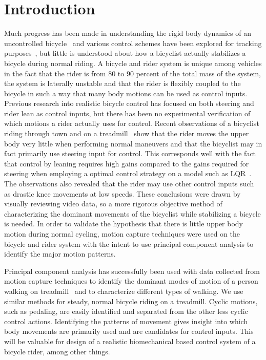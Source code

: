 \section{Introduction}
\label{intro}
Much progress has been made in understanding the rigid body dynamics of an uncontrolled bicycle~\cite{Meijaard2007} and various control schemes have been explored for tracking purposes~\cite{Peterson2008a,Schwab2008,Sharp2008a}, but little is understood about how a bicyclist actually stabilizes a bicycle during normal riding. A bicycle and rider system is unique among vehicles in the fact that the rider is from 80 to 90 percent of the total mass of the system, the system is laterally unstable and that the rider is flexibly coupled to the bicycle in such a way that many body motions can be used as control inputs. Previous research into realistic bicycle control has focused on both steering and rider lean as control inputs, but there has been no experimental verification of which motions a rider actually uses for control. Recent observations of a bicyclist riding through town and on a treadmill~\cite{Kooijman2009a} show that the rider moves the upper body very little when performing normal maneuvers and that the bicyclist may in fact primarily use steering input for control. This corresponds well with the fact that control by leaning requires high gains compared to the gains required for steering when employing a optimal control strategy on a model such as LQR~\cite{Peterson2008a,Schwab2008,Sharp2008a}. The observations also revealed that the rider may use other control inputs such as drastic knee movements at low speeds. These conclusions were drawn by visually reviewing video data, so a more rigorous objective method of characterizing the dominant movements of the bicyclist while stabilizing a bicycle is needed. In order to validate the hypothesis that there is little upper body motion during normal cycling, motion capture techniques were used on the bicycle and rider system with the intent to use principal component analysis to identify the major motion patterns.

Principal component analysis has successfully been used with data collected from motion capture techniques to identify the dominant modes of motion of a person walking on treadmill~\cite{Troje2002} and to characterize different types of walking. We use similar methods for steady, normal bicycle riding on a treadmill. Cyclic motions, such as pedaling, are easily identified and separated from the other less cyclic control actions. Identifying the patterns of movement gives insight into which body movements are primarily used and are candidates for control inputs. This will be valuable for design of a realistic biomechanical based control system of a bicycle rider, among other things.
